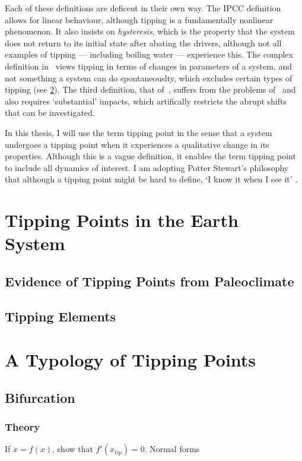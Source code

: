 Each of these definitions are deficent in their own way. The IPCC definition allows for linear behaviour, although tipping is a fundamentally nonlinear phenomenon. It also insists on \emph{hysteresis},
which is the property that the system does not return to its initial state after abating the drivers, although not all examples of tipping --- including boiling water --- experience this.
The complex definition in~\cite{Lenton2008} views tipping in terms of changes in parameters of a system, and not something a system can do spontaneouslty, which excludes certain types of
tipping (see \cref{sec:tipping_typology}). The third definition, that of~\cite{ArmstrongMcKay2022}, suffers from the problems of~\cite{Lenton2008} and also requires `substantial' impacts, which
artifically restricts the abrupt shifts that can be investigated.

In this thesis, I will use the term tipping point in the sense that a system undergoes a tipping point when it experiences a qualitative change in its properties. Although this is a vague definition,
it enables the term tipping point to include all dynamics of interest. I am adopting Potter Stewart's philosophy that although a tipping point might be hard to define,
`I know it when I see it' \parencite{Stewart1964}.


\section{Tipping Points in the Earth System}
\subsection{Evidence of Tipping Points from Paleoclimate}
\subsection{Tipping Elements}

\section{A Typology of Tipping Points}
\label{sec:tipping_typology}
\subsection{Bifurcation}
\subsubsection{Theory}
If $\dot{x} = f(x)$, show that $f'(x_{tip}) = 0$. Normal forms
